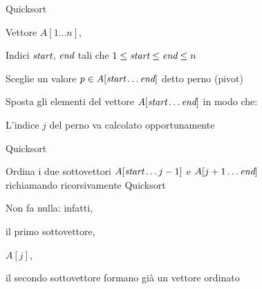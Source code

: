 \begin{frame}{Quicksort}

\vspace{-9pt}
\begin{myboxtitle}[Input]
\BI
\item Vettore $A[1 \ldots n]$, 
\item Indici $\textit{start}$, $\textit{end}$ tali che $1 \leq \textit{start} \leq \textit{end} \leq n$
\EI
\end{myboxtitle}

\begin{myboxtitle}[Divide]
\BIL
\item Sceglie un valore $p \in A[\textit{start} \ldots \textit{end}]$ 
  detto \alert{perno} (\alert{pivot})
\item Sposta gli elementi del vettore $A[\textit{start} \ldots \textit{end}]$ in modo che:



\item L'indice $j$ del perno va calcolato opportunamente
\EIL
\end{myboxtitle}

\end{frame}

\begin{frame}{Quicksort}

\vspace{-9pt}
\begin{myboxtitle}[Impera]
Ordina i due sottovettori $A[\textit{start} \ldots j  -  1]$ e $A[j + 1 \ldots \textit{end}]$\\ 
richiamando ricorsivamente Quicksort
\end{myboxtitle}

\begin{myboxtitle}[Combina]
Non fa nulla: infatti,
\BI
\item il primo sottovettore,
\item $A[j]$,
\item il secondo sottovettore 
\EI
formano già un vettore ordinato
\end{myboxtitle}

\end{frame}


